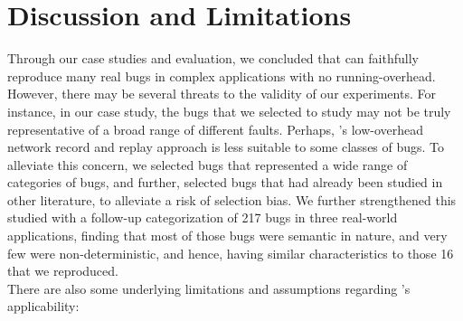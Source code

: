 
\section{Discussion and Limitations}
\label{sec:parikshanThreats}

Through our case studies and evaluation, we concluded that \parikshan can faithfully reproduce many real bugs in complex applications with no running-overhead.
However, there may be several threats to the validity of our experiments.
For instance, in our case study, the bugs that we selected to study may not be truly representative of a broad range of different faults.
Perhaps, \parikshan's low-overhead network record and replay approach is less suitable to some classes of bugs.
To alleviate this concern, we selected bugs that represented a wide range of categories of bugs, and further, selected bugs that had already been studied in other literature, to alleviate a risk of selection bias.
We further strengthened this studied with a follow-up categorization of 217 bugs in three real-world applications, finding that most of those bugs were semantic in nature, and very few were non-deterministic, and hence, having similar characteristics to those 16 that we reproduced. \\

\noindent There are also some underlying limitations and assumptions regarding \parikshan's applicability:



